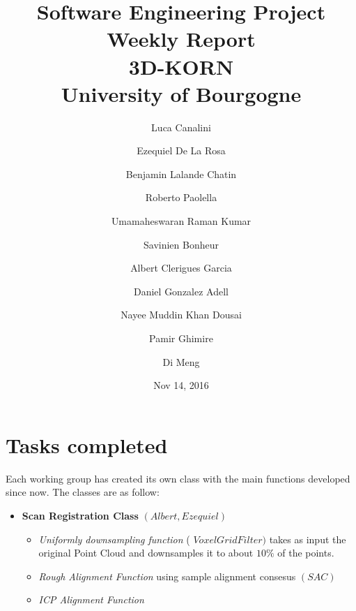 \documentclass[11pt]{article} %
\title{Software Engineering Project Weekly Report\\ \textbf{3D-KORN} \\ University of Bourgogne}
\author{Luca Canalini \and Ezequiel De La Rosa \and Benjamin Lalande Chatin \and Roberto Paolella \and Umamaheswaran Raman Kumar \and Savinien Bonheur \and Albert Clerigues Garcia \and Daniel Gonzalez Adell \and Nayee Muddin Khan Dousai \and Pamir Ghimire \and Di Meng
}
\date{Nov 14, 2016} %
\begin{document}
\maketitle
\newpage
\section{Tasks completed}
	Each working group has created its own class with the main functions developed since now. 
	The classes are as follow:
	
\begin{itemize}

	\item \textbf{Scan Registration Class} $(Albert, Ezequiel)$
	\begin{itemize}
		\item \textit{Uniformly downsampling function} ( $VoxelGrid Filter)$ takes as input the original Point Cloud and downsamples it to about $10 \% $ of the points.
		\item \textit{Rough Alignment Function} using sample alignment consesus $(SAC)$ 
		\item \textit{ICP Alignment Function}	
	\end{itemize}
	

\end{itemize}
\end{document}
